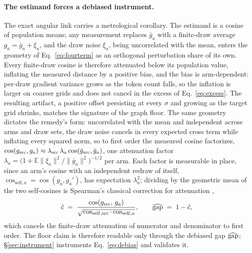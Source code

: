 \paragraph{The estimand forces a debiased instrument.}
The exact angular link carries a metrological corollary. The estimand
is a cosine of population means; any measurement replaces $\bar g_a$
with a finite-draw average $g_a = \bar g_a + \xi_a$, and the draw noise
$\xi_a$, being uncorrelated with the mean, enters the geometry of
Eq.~\ref{eq:fourterm} as an orthogonal perturbation share of its own.
Every finite-draw cosine is therefore attenuated below its population
value, inflating the measured distance by a positive bias, and the
bias is arm-dependent: per-draw gradient variance grows as the token
count falls, so the inflation is larger on coarser grids and does not
cancel in the excess of Eq.~\ref{eq:excess}. The resulting artifact,
a positive offset persisting at every $\sigma$ and growing as the
target grid shrinks, matches the signature of the graph floor.
The same geometry dictates the remedy's form: uncorrelated with the
mean and independent across arms and draw sets, the draw noise
cancels in every expected cross term while inflating every
squared norm, so to first order the measured cosine factorizes,
$\cos(g_{\mathrm{src}}, g_a) \approx \lambda_{\mathrm{src}}\,\lambda_a
\cos(\bar g_{\mathrm{src}}, \bar g_a)$, one attenuation factor
$\lambda_a = \big(1 + \mathbb{E}\|\xi_a\|^2 /
\|\bar g_a\|^2\big)^{-1/2}$ per arm. Each factor is measurable in
place, since an arm's cosine with an independent redraw of itself,
$\cos_{\mathrm{self},a} = \cos(g_a, g_a')$, has expectation
$\lambda_a^2$; dividing by the geometric mean of the two self-cosines
is Spearman's classical correction for attenuation
\citep{spearman1904},
\begin{equation}
\hat c \;=\; \frac{\cos(g_{\mathrm{src}},\, g_{a})}
{\sqrt{\cos_{\mathrm{self},\mathrm{src}} \cdot \cos_{\mathrm{self},a}}},
\qquad
\widehat{\mathrm{gap}} \;=\; 1 - \hat c,
\label{eq:debias}
\end{equation}
which cancels the finite-draw attenuation of numerator and
denominator to first order. The floor claim is therefore readable
only through the debiased gap $\widehat{\mathrm{gap}}$;
\S\ref{sec:instrument} instruments Eq.~\ref{eq:debias} and validates
it.
